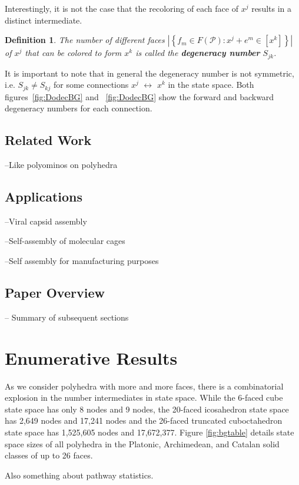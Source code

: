 \documentclass[12pt]{article}
\newtheorem{mydef}{Definition}
\newcommand{\faceset}{F\left(\mathscr{P}\right)}
\newcommand{\spc}{ }
\newcommand{\xj}{$x^j$}
\newcommand{\xk}{$x^k$}
\newcommand{\Sjk}{$S_{jk}$}
\newcommand{\Skj}{$S_{kj}$}
\begin{document}
Interestingly, it is not the case that the recoloring of each face of \xj\spc results in a distinct intermediate. 
\begin{mydef}
The number of different faces $\left|\left\{f_m \in \faceset : x^j + e^m \in \left[x^k\right]\right\}\right|$ of \xj\spc that can be colored to form \xk\spc is called the \textbf{degeneracy number} \Sjk.
\end{mydef}
It is important to note that in general the degeneracy number is not symmetric, i.e. \Sjk$\neq$\Skj\spc for some connections \xj\spc$\leftrightarrow$\spc\xk\spc in the state space. Both figures~\ref{fig:DodecBG} and ~\ref{fig:DodecBG} show the forward and backward degeneracy numbers for each connection.

\subsection{Related Work}
--Like polyominos on polyhedra

\subsection{Applications}
--Viral capsid assembly

--Self-assembly of molecular cages

--Self assembly for manufacturing purposes
\subsection{Paper Overview}
-- Summary of subsequent sections

\section{Enumerative Results}

As we consider polyhedra with more and more faces, there is a combinatorial explosion in the number intermediates in state space. While the 6-faced cube state space has only 8 nodes and 9 nodes, the 20-faced icosahedron state space has 2,649 nodes and 17,241 nodes and the 26-faced truncated cuboctahedron state space has 1,525,605 nodes and 17,672,377. Figure \ref{fig:bgtable} details state space sizes of all polyhedra in the Platonic, Archimedean, and Catalan solid classes of up to 26 faces. 


Also something about pathway statistics. 
\end{document}
